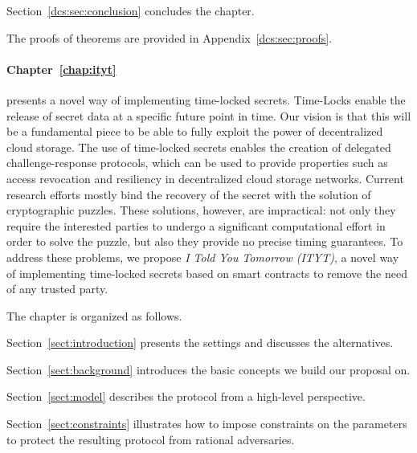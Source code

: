 {\begin{compactitem}
	\item Section~\ref{dcs:sec:conclusion} concludes the chapter.\vspace{.5em}
	
	\item The proofs of theorems are provided in Appendix~\ref{dcs:sec:proofs}.
\end{compactitem}

\medskip

\paragraph*{Chapter~\ref{chap:ityt}} presents a novel way of implementing time-locked secrets. Time-Locks enable the release of secret data at a specific future point in time. Our vision is that this will be a fundamental piece to be able to fully exploit the power of decentralized cloud storage. The use of time-locked secrets enables the creation of delegated challenge-response protocols, which can be used to provide properties such as access revocation and resiliency in decentralized cloud storage networks.
%
Current research efforts mostly bind the recovery of the secret with the solution of cryptographic puzzles. These solutions, however, are  impractical: not only they require the interested parties to undergo a significant computational effort in order to solve the puzzle, but also they provide no precise timing guarantees.
%
To address these problems, we propose {\em I {\em Told} You Tomorrow (ITYT)}, a novel way of implementing time-locked secrets based on smart contracts to remove the need of any trusted party.

\smallskip
\noindent The chapter is organized as follows.

\begin{compactitem}
	
\item Section~\ref{sect:introduction} presents the settings and discusses the alternatives.
	
\item Section~\ref{sect:background} introduces the basic concepts we build our proposal on. 

\item Section~\ref{sect:model} describes the protocol from a high-level perspective.

\item Section~\ref{sect:constraints} illustrates how to impose constraints on the parameters to protect the resulting protocol from rational adversaries.


\end{compactitem}}
